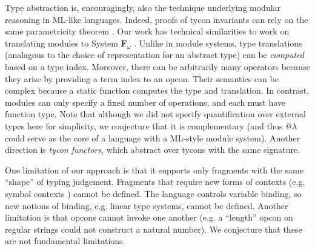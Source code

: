 \documentclass[10pt,preprint]{sigplanconf}
\begin{document}
Type abstraction is, encouragingly, also the technique underlying modular reasoning in ML-like languages. Indeed, proofs of tycon invariants can rely on the same parametricity theorem \cite{WadlerThms}. Our work has technical similarities to work on  translating modules to System $\mathbf{F}_\omega$ \cite{conf/tldi/RossbergRD10}.  Unlike in module systems, type translations (analagous to the choice of representation for an abstract type) can be \emph{computed} based on a type index. Moreover, there can be arbitrarily many operators because they arise by providing a term index to an opcon. Their semantics can be complex because a static function computes the type and translation. In contrast, modules can only specify a fixed number of operations, and each must have function type. Note that although we did not specify quantification over external types here for simplicity, we conjecture that it is complementary (and thus @$\lambda$ could serve as the core of a language with a ML-style module system). Another direction is \emph{tycon functors}, which abstract over tycons with the same  signature. %

One limitation of our approach is that it supports only  fragments with the same ``shape'' of typing judgement. Fragments that require new forms of contexts (e.g. symbol contexts \cite{pfpl})  cannot be defined. The language controls variable binding, so new notions of binding, e.g. linear type systems, cannot be defined. Another limitation is that opcons cannot invoke one another (e.g. a ``length'' opcon on regular strings could not construct a natural number). We conjecture that these are not fundamental limitations. %



\end{document}
